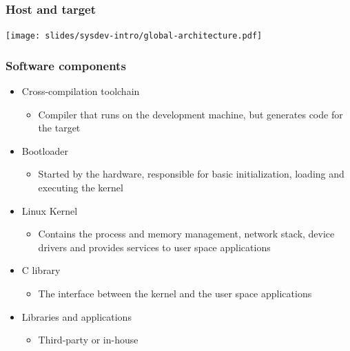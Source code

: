\begin{frame}
  \frametitle{Host and target}
  \begin{center}
    \texttt{[image: slides/sysdev-intro/global-architecture.pdf]}
  \end{center}
\end{frame}

\begin{frame}
  \frametitle{Software components}
  \begin{itemize}
  \item Cross-compilation toolchain
    \begin{itemize}
    \item Compiler that runs on the development machine, but generates
      code for the target
    \end{itemize}
  \item Bootloader
    \begin{itemize}
    \item Started by the hardware, responsible for basic
      initialization, loading and executing the kernel
    \end{itemize}
  \item Linux Kernel
    \begin{itemize}
    \item Contains the process and memory management, network stack,
      device drivers and provides services to user space applications
    \end{itemize}
  \item C library
    \begin{itemize}
    \item The interface between the kernel and the user space
      applications
    \end{itemize}
  \item Libraries and applications
    \begin{itemize}
    \item Third-party or in-house
    \end{itemize}
  \end{itemize}
\end{frame}

